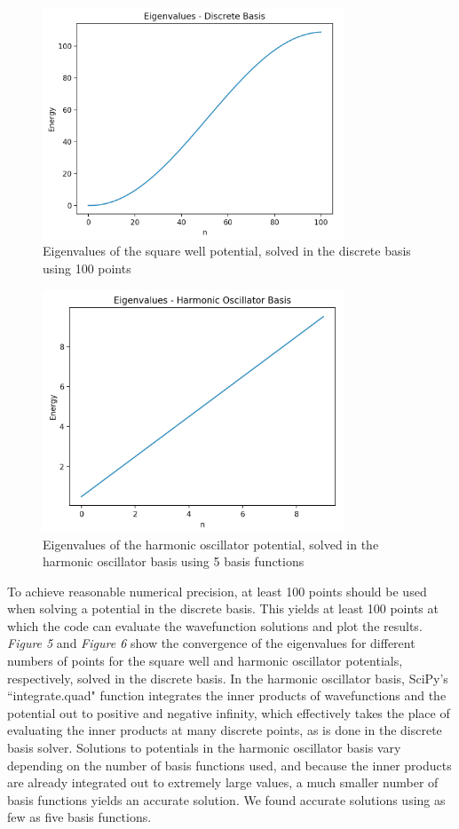 \documentclass[%
 reprint,
 amsmath,amssymb,
 aps,
]{revtex4-1}
\begin{document}
\begin{figure}
\includegraphics[width=9cm]{DiscreteSquareWellEigenvalues}
\caption{Eigenvalues of the square well potential, solved in the discrete basis using 100 points}
\end{figure}
\begin{figure}
\includegraphics[width=9cm]{HOHarmonicOscillatorEigenvalues}
\caption{Eigenvalues of the harmonic oscillator potential, solved in the harmonic oscillator basis using 5 basis functions}
\end{figure}

\noindent To achieve reasonable numerical precision, at least 100 points should be used when solving a potential in the discrete basis.  This yields at least 100 points at which the code can evaluate the wavefunction solutions and plot the results.  \textit{Figure 5} and \textit{Figure 6} show the convergence of the eigenvalues for different numbers of points for the square well and harmonic oscillator potentials, respectively, solved in the discrete basis.  In the harmonic oscillator basis, SciPy's ``integrate.quad" function integrates the inner products of wavefunctions and the potential out to positive and negative infinity, which effectively takes the place of evaluating the inner products at many discrete points, as is done in the discrete basis solver.  Solutions to potentials in the harmonic oscillator basis vary depending on the number of basis functions used, and because the inner products are already integrated out to extremely large values, a much smaller number of basis functions yields an accurate solution.  We found accurate solutions using as few as five basis functions.\\
\end{document}
